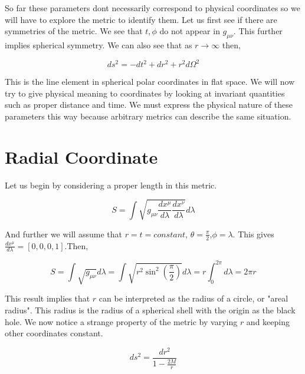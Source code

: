 \documentclass[10pt]{article}
\begin{document}
So far these parameters dont necessarily correspond to physical coordinates so we will have to explore the metric to identify them. Let us first see if there are symmetries of the metric. We see that $t,\phi$ do not appear in $g_{\mu\nu}$. This further implies spherical symmetry. We can also see that as $r \rightarrow \infty$ then, 

\begin{equation}
ds^2 = -dt^2 + dr^2 +r^2d\Omega^2
\end{equation}

This is the line element in spherical polar coordinates in flat space. We will now try to give physical meaning to coordinates by looking at invariant quantities such as proper distance and time. We must express the physical nature of these parameters this way because arbitrary metrics can describe the same situation. 

\section{Radial Coordinate} 

Let us begin by considering a proper length in this metric. 

\begin{equation}
S = \int \sqrt{g_{\mu\nu} \frac{dx^\mu}{d\lambda} \frac{dx^\nu}{d\lambda} } d\lambda
\end{equation}

And further we will assume that $r=t=constant$, $\theta = \frac{\pi}{2}$,$ \phi = \lambda$. This gives $\frac{dx^\mu}{d\lambda} = [0,0,0,1]$.Then, 

\begin{equation}
S =\int \sqrt{g_{\mu\nu}} d\lambda = \int \sqrt{r^2\sin^2(\frac{\pi}{2})} d\lambda = r \int_{0}^{2\pi} d\lambda = 2 \pi r
\end{equation}

This result implies that $r$ can be interpreted as the radius of a circle, or "areal radius". This radius is the radius of a spherical shell with the origin as the black hole. We now notice a strange property of the metric by varying $r$ and keeping other coordinates constant. 

\begin{equation}
ds^2 =\frac{dr^2}{1 - \frac{2M}{r}}
\end{equation}
\end{document}
